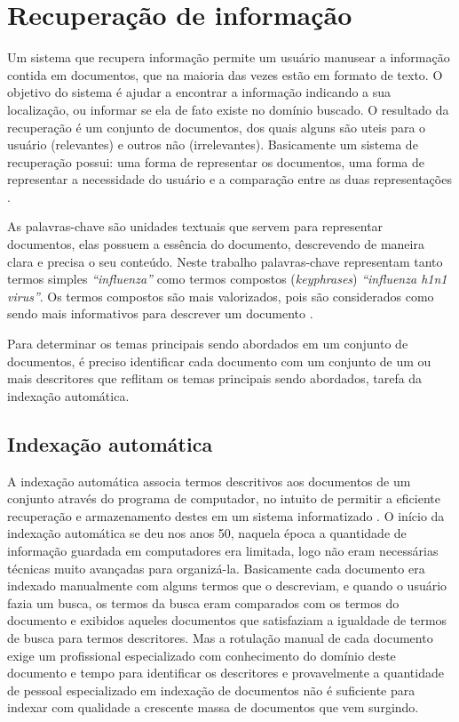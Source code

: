 \chapter{Recuperação de informação}
Um sistema que recupera informação permite um usuário manusear a informação contida em documentos, que na maioria das vezes estão em formato de texto. O objetivo do sistema é ajudar a encontrar a informação indicando a sua localização, ou informar se ela de fato existe no domínio buscado. O resultado da recuperação é um conjunto de documentos, dos quais alguns são uteis para o usuário (relevantes) e outros não (irrelevantes). Basicamente um sistema de recuperação possui: uma forma de representar os documentos, uma forma de representar a necessidade do usuário e a comparação entre as duas representações \cite{Goker2009}. 

As palavras-chave são unidades textuais que servem para representar documentos, elas possuem a essência do documento, descrevendo de maneira clara e precisa o seu conteúdo. Neste trabalho palavras-chave representam tanto termos simples \emph{“influenza”} como termos compostos (\emph{keyphrases}) \emph{“influenza h1n1 virus”}. Os termos compostos são mais valorizados, pois são considerados como sendo mais informativos para descrever um documento \cite{Fagan1989}.

Para determinar os temas principais sendo abordados em um conjunto de documentos, é preciso identificar cada documento com um conjunto de um ou mais descritores que reflitam os temas principais sendo abordados, tarefa da indexação automática.

\section{Indexação automática}
A indexação automática associa termos descritivos aos documentos de um conjunto através do programa de computador, no intuito de permitir a eficiente recuperação e armazenamento destes em um sistema informatizado \cite{Gonzalez2006}. O início da indexação automática se deu nos anos 50, naquela época a quantidade de informação guardada em computadores era limitada, logo não eram necessárias técnicas muito avançadas para organizá-la. Basicamente cada documento era indexado manualmente com alguns termos que o descreviam, e quando o usuário fazia um busca, os termos da busca eram comparados com os termos do documento e exibidos aqueles documentos que satisfaziam a igualdade de termos de busca para termos descritores. Mas a rotulação manual de cada documento exige um profissional especializado com conhecimento do domínio deste documento e tempo para identificar os descritores e provavelmente a quantidade de pessoal especializado em indexação de documentos não é suficiente para indexar com qualidade a crescente massa de documentos que vem surgindo.

